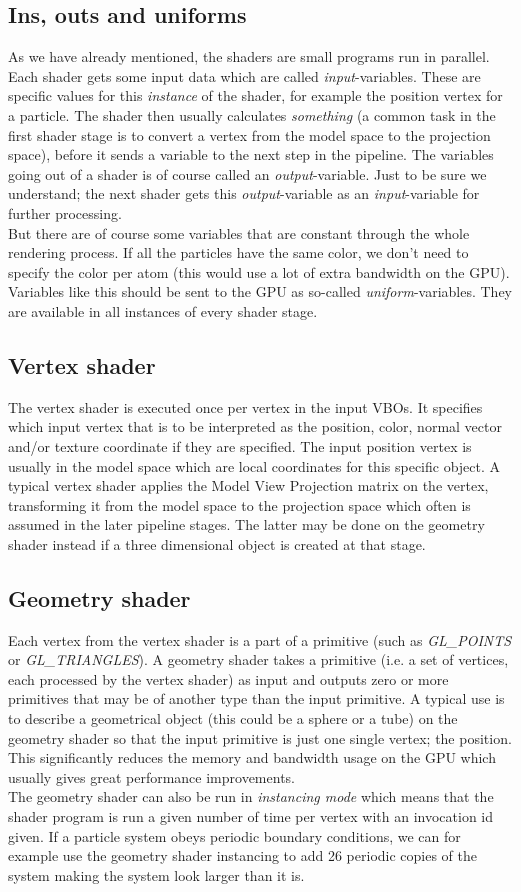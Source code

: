 \subsection{Ins, outs and uniforms}
\label{sec:opengl_uniforms}
As we have already mentioned, the shaders are small programs run in parallel. Each shader gets some input data which are called \textit{input}-variables. These are specific values for this \textit{instance} of the shader, for example the position vertex for a particle. The shader then usually calculates \textit{something} (a common task in the first shader stage is to convert a vertex from the model space to the projection space), before it sends a variable to the next step in the pipeline. The variables going out of a shader is of course called an \textit{output}-variable. Just to be sure we understand; the next shader gets this \textit{output}-variable as an \textit{input}-variable for further processing.\\
But there are of course some variables that are constant through the whole rendering process. If all the particles have the same color, we don't need to specify the color per atom (this would use a lot of extra bandwidth on the GPU). Variables like this should be sent to the GPU as so-called \textit{uniform}-variables. They are available in all instances of every shader stage.
\subsection{Vertex shader}
The vertex shader is executed once per vertex in the input VBOs. It specifies which input vertex that is to be interpreted as the position, color, normal vector and/or texture coordinate if they are specified. The input position vertex is usually in the model space which are local coordinates for this specific object. A typical vertex shader applies the Model View Projection matrix on the vertex, transforming it from the model space to the projection space which often is assumed in the later pipeline stages. The latter may be done on the geometry shader instead if a three dimensional object is created at that stage.
\subsection{Geometry shader}
Each vertex from the vertex shader is a part of a primitive (such as \textit{GL\_POINTS} or \textit{GL\_TRIANGLES}). A geometry shader takes a primitive (i.e. a set of vertices, each processed by the vertex shader) as input and outputs zero or more primitives that may be of another type than the input primitive. A typical use is to describe a geometrical object (this could be a sphere or a tube) on the geometry shader so that the input primitive is just one single vertex; the position. This significantly reduces the memory and bandwidth usage on the GPU which usually gives great performance improvements.\\
The geometry shader can also be run in \textit{instancing mode} which means that the shader program is run a given number of time per vertex with an invocation id given. If a particle system obeys periodic boundary conditions, we can for example use the geometry shader instancing to add 26 periodic copies of the system making the system look larger than it is. 
